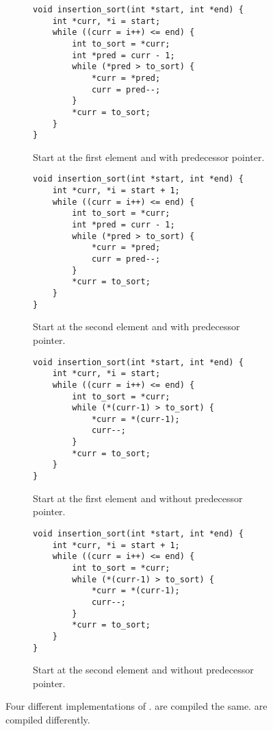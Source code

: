 \begin{figure}
	\def\iscodewidth{0.48\linewidth}
	\begin{subfigure}{\iscodewidth}
		\begin{lstlisting}
void insertion_sort(int *start, int *end) {
	int *curr, *i = start;
	while ((curr = i++) <= end) {
		int to_sort = *curr;
		int *pred = curr - 1;
		while (*pred > to_sort) {
			*curr = *pred;
			curr = pred--;
		}
		*curr = to_sort;
	}
}
		\end{lstlisting}
		\caption{
			Start at the first element and with predecessor pointer.
		}
		\label{fig:insertion:impl:pred_first}
	\end{subfigure}
	\hfill
	\begin{subfigure}{\iscodewidth}
		\begin{lstlisting}
void insertion_sort(int *start, int *end) {
	int *curr, *i = start + 1;
	while ((curr = i++) <= end) {
		int to_sort = *curr;
		int *pred = curr - 1;
		while (*pred > to_sort) {
			*curr = *pred;
			curr = pred--;
		}
		*curr = to_sort;
	}
}
		\end{lstlisting}
		\caption{
			Start at the second element and with predecessor pointer.
		}
		\label{fig:insertion:impl:pred_sec}
	\end{subfigure}

	\begin{subfigure}{\iscodewidth}
		\begin{lstlisting}
void insertion_sort(int *start, int *end) {
	int *curr, *i = start;
	while ((curr = i++) <= end) {
		int to_sort = *curr;
		while (*(curr-1) > to_sort) {
			*curr = *(curr-1);
			curr--;
		}
		*curr = to_sort;
	}
}
		\end{lstlisting}
		\caption{
			Start at the first element and without predecessor pointer.
		}
		\label{fig:insertion:impl:offset_first}
	\end{subfigure}
	\hfill
	\begin{subfigure}{\iscodewidth}
		\begin{lstlisting}
void insertion_sort(int *start, int *end) {
	int *curr, *i = start + 1;
	while ((curr = i++) <= end) {
		int to_sort = *curr;
		while (*(curr-1) > to_sort) {
			*curr = *(curr-1);
			curr--;
		}
		*curr = to_sort;
	}
}
		\end{lstlisting}
		\caption{
			Start at the second element and without predecessor pointer.
		}
		\label{fig:insertion:impl:offset_sec}
	\end{subfigure}
	\caption{
		Four different implementations of \IS{}.
		 are compiled the same.
		 are compiled differently.
	}
\end{figure}

